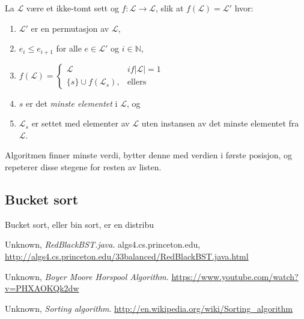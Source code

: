 \documentclass[11pt,a4paper]{article}
\theoremstyle{def}
\begin{document}
\noindent La $\mathcal{L}$ være et ikke-tomt sett og $f : \mathcal{L} \rightarrow \mathcal{L}$, slik at $f(\mathcal{L}) = \mathcal{L}'$ hvor:
\begin{enumerate}
\item
$\mathcal{L}'$ er en permutasjon av $\mathcal{L}$,

\item
$e_i \leq e_{i+1}$ for alle $e \in \mathcal{L}'$ og $i \in \mathbb{N}$,

\item
$f(\mathcal{L}) = \left\{\begin{array}{ll}
   \mathcal{L} & if |\mathcal{L}|=1\\
    \{s\} \cup f(\mathcal{L}_s),&\mathrm{ellers}
  \end{array}\right.$

\item
$s$ er det \textit{minste elementet} i $\mathcal{L}$, og

\item
$\mathcal{L}_s$ er settet med elementer av $\mathcal{L}$ uten instansen av det minste elementet fra $\mathcal{L}$.
\end{enumerate}

Algoritmen finner minste verdi, bytter denne med verdien i første posisjon, og repeterer disse stegene for resten av listen. 

\subsection{Bucket sort}
Bucket sort, eller bin sort, er en distribu



\newpage

\begin{thebibliography}{}

  Unknown,
  \emph{RedBlackBST.java}.
  algs4.cs.princeton.edu,
  \url{http://algs4.cs.princeton.edu/33balanced/RedBlackBST.java.html}

  Unknown,
  \emph{Boyer Moore Horspool Algorithm}.
  \url{https://www.youtube.com/watch?v=PHXAOKQk2dw}

  Unknown,
  \emph{Sorting algorithm}.
  \url{http://en.wikipedia.org/wiki/Sorting_algorithm}



\end{thebibliography}



\newpage

\listoftables
\listoffigures
\end{document}
